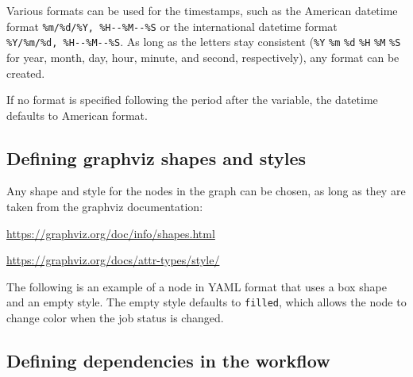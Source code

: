 Various formats can be used for the timestamps, such as the American
datetime format \texttt{\%m/\%d/\%Y,\ \%H-\/-\%M-\/-\%S} or the
international datetime format \texttt{\%Y/\%m/\%d,\ \%H-\/-\%M-\/-\%S}.
As long as the letters stay consistent (\texttt{\%Y} \texttt{\%m}
\texttt{\%d} \texttt{\%H} \texttt{\%M} \texttt{\%S} for year, month,
day, hour, minute, and second, respectively), any format can be created.

If no format is specified following the period after the variable, the
datetime defaults to American format.

\subsection{Defining graphviz shapes and
styles}\label{defining-graphviz-shapes-and-styles}

Any shape and style for the nodes in the graph can be chosen, as long as
they are taken from the graphviz documentation:

\url{https://graphviz.org/doc/info/shapes.html}

\url{https://graphviz.org/docs/attr-types/style/}

The following is an example of a node in YAML format that uses a box
shape and an empty style. The empty style defaults to \texttt{filled},
which allows the node to change color when the job status is changed.

\begin{Shaded}
\begin{Highlighting}[]
\end{Highlighting}
\end{Shaded}

\subsection{Defining dependencies in the
workflow}\label{defining-dependencies-in-the-workflow}

